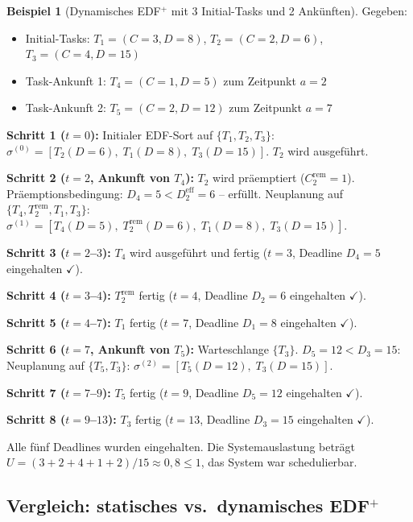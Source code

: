 ﻿\documentclass[a4paper,12pt]{article}
\theoremstyle{definition}
\newtheorem{beispiel}{Beispiel}
\begin{document}
	\begin{beispiel}[Dynamisches EDF$^+$ mit 3 Initial-Tasks und 2 Ankünften]
		Gegeben:
		\begin{itemize}
			\item Initial-Tasks: $T_1 = (C=3, D=8)$, $T_2 = (C=2, D=6)$, $T_3 = (C=4, D=15)$
			\item Task-Ankunft 1: $T_4 = (C=1, D=5)$ zum Zeitpunkt $a=2$
			\item Task-Ankunft 2: $T_5 = (C=2, D=12)$ zum Zeitpunkt $a=7$
		\end{itemize}

		\textbf{Schritt 1 ($t=0$):} Initialer EDF-Sort auf $\{T_1, T_2, T_3\}$:
		$\sigma^{(0)} = [T_2(D=6),\; T_1(D=8),\; T_3(D=15)]$.
		$T_2$ wird ausgeführt.

		\textbf{Schritt 2 ($t=2$, Ankunft von $T_4$):} $T_2$ wird präemptiert
		($C_2^{\text{rem}} = 1$). Präemptionsbe\-dingung: $D_4 = 5 < D_2^{\text{eff}} = 6$
		-- erfüllt. Neuplanung auf $\{T_4, T_2^{\text{rem}}, T_1, T_3\}$:
		$\sigma^{(1)} = [T_4(D=5),\; T_2^{\text{rem}}(D=6),\; T_1(D=8),\; T_3(D=15)]$.

		\textbf{Schritt 3 ($t=2$--$3$):} $T_4$ wird ausgeführt und fertig ($t=3$,
		Deadline $D_4=5$ eingehalten $\checkmark$).

		\textbf{Schritt 4 ($t=3$--$4$):} $T_2^{\text{rem}}$ fertig ($t=4$,
		Deadline $D_2=6$ eingehalten $\checkmark$).

		\textbf{Schritt 5 ($t=4$--$7$):} $T_1$ fertig ($t=7$, Deadline $D_1=8$ eingehalten $\checkmark$).

		\textbf{Schritt 6 ($t=7$, Ankunft von $T_5$):} Warteschlange $\{T_3\}$.
		$D_5 = 12 < D_3 = 15$: Neuplanung auf $\{T_5, T_3\}$:
		$\sigma^{(2)} = [T_5(D=12),\; T_3(D=15)]$.

		\textbf{Schritt 7 ($t=7$--$9$):} $T_5$ fertig ($t=9$, Deadline $D_5=12$ eingehalten $\checkmark$).

		\textbf{Schritt 8 ($t=9$--$13$):} $T_3$ fertig ($t=13$, Deadline $D_3=15$ eingehalten $\checkmark$).

		Alle fünf Deadlines wurden eingehalten. Die Systemauslastung beträgt
		$U = (3+2+4+1+2)/15 \approx 0{,}8 \le 1$, das System war schedulierbar.
	\end{beispiel}

	\subsection{Vergleich: statisches vs.\ dynamisches EDF$^+$}
\end{document}
